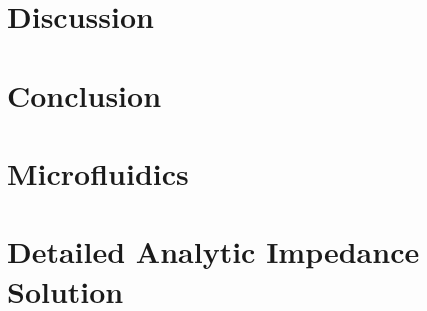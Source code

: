 \documentclass[12pt]{report}
\begin{document}
\chapter{Discussion}


\chapter{Conclusion}


\begin{appendices}

\chapter{Microfluidics}


\chapter[Analytic IS]{Detailed Analytic Impedance Solution}


%
\end{appendices}
%
%
%



{} 
\singlespacing
\printbibliography
\end{document}
